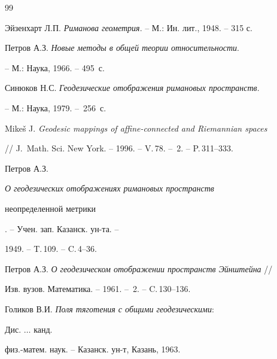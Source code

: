 \begin{thebibliography}{99}







Эйзенхарт Л.П. {\em Риманова геометрия}. -- М.: Ин. лит., 1948. -- 315 с.







Петров А.З. {\em Новые методы в общей теории относительности}.


-- М.: Наука, 1966. -- 495~с. 







Синюков Н.С. {\em Геодезические отображения римановых пространств}.


-- М.: Наука, 1979. --~256~с.







Mike\v s J. {\em Geodesic mappings of affine-connected and Riemannian spaces}


// J.~Math. Sci. New York. -- 1996. -- V.\,78. -- \No\,2. -- P.\,311--333.







Петров А.З. {\em О геодезических отображениях римановых пространств


неопределенной метрики}. -- Учен. зап. Казанск. ун-та. --


1949. -- T.\,109. -- C.\,4--36.







Петров А.З. {\em О геодезическом отображении  пространств Эйнштейна} //


Изв. вузов. Математика. -- 1961. -- \No\,2. -- C.\,130--136.







Голиков В.И. {\em Поля тяготения с общими геодезическими}:


Дис. $\dotsc$ канд.


физ.-матем. наук. -- Казанск. ун-т, Казань, 1963.






\end{thebibliography}
